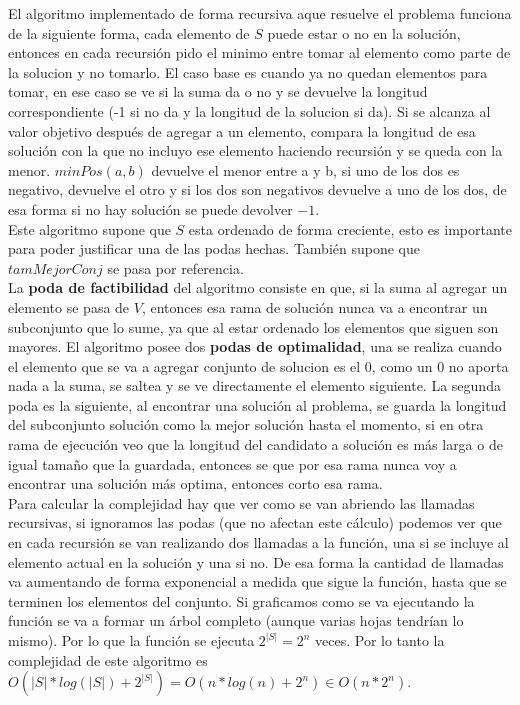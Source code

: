 \documentclass[a4paper]{article}
\begin{document}
El algoritmo implementado de forma recursiva aque resuelve el problema funciona de la siguiente forma, cada elemento de $S$ puede estar o no en la solución, entonces en cada recursión pido el minimo entre tomar al elemento como parte de la solucion y no tomarlo. El caso base es cuando ya no quedan elementos para tomar, en ese caso se ve si la suma da o no y se devuelve la longitud correspondiente (-1 si no da y la longitud de la solucion si da). Si se alcanza al valor objetivo después de agregar a un elemento, compara la longitud de esa solución con la que no incluyo ese elemento haciendo recursión y se queda con la menor. $minPos(a, b)$ devuelve el menor entre a y b, si uno de los dos es negativo, devuelve el otro y si los dos son negativos devuelve a uno de los dos, de esa forma si no hay solución se puede devolver $-1$.
\\
Este algoritmo supone que $S$ esta ordenado de forma creciente, esto es importante para poder justificar una de las podas hechas. También supone que $tamMejorConj$ se pasa por referencia.
\\

La \textbf{poda de factibilidad} del algoritmo consiste en que, si la suma al agregar un elemento se pasa de $V$, entonces esa rama de solución nunca va a encontrar un subconjunto que lo sume, ya que al estar ordenado los elementos que siguen son mayores. El algoritmo posee dos \textbf{podas de optimalidad}, una se realiza cuando el elemento que se va a agregar conjunto de solucion es el 0, como un 0 no aporta nada a la suma, se saltea y se ve directamente el elemento siguiente.
La segunda poda es la siguiente, al encontrar una solución al problema, se guarda la longitud del subconjunto solución como la mejor solución hasta el momento, si en otra rama de ejecución veo que la longitud del candidato a solución es más larga o de igual tamaño que la guardada, entonces se que por esa rama nunca voy a encontrar una solución más optima, entonces corto esa rama.
\\

Para calcular la complejidad hay que ver como se van abriendo las llamadas recursivas, si ignoramos las podas (que no afectan este cálculo) podemos ver que en cada recursión se van realizando dos llamadas a la función, una si se incluye al elemento actual en la solución y una si no. De esa forma la cantidad de llamadas va aumentando de forma exponencial a medida que sigue la función, hasta que se terminen los elementos del conjunto. Si graficamos como se va ejecutando la función se va a formar un árbol completo (aunque varias hojas tendrían lo mismo). Por lo que la función se ejecuta $2^{|S|} = 2^n$ veces.
Por lo tanto la complejidad de este algoritmo es $O(|S|*log(|S|) + 2^|S|) = O(n*log(n) + 2^n) \in O(n*2^n)$.
 
\end{document}
